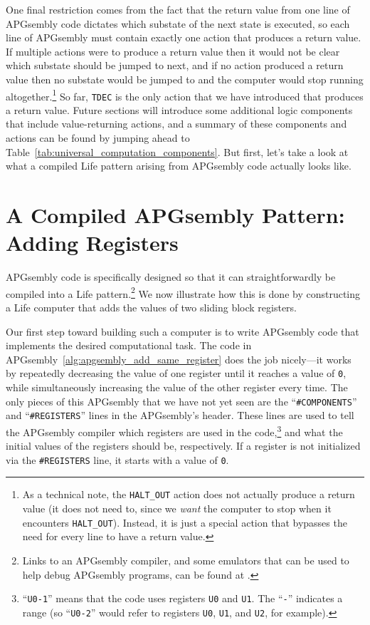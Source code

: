 One final restriction comes from the fact that the return value from one line of APGsembly code dictates which substate of the next state is executed, so each line of APGsembly must contain exactly one action that produces a return value. If multiple actions were to produce a return value then it would not be clear which substate should be jumped to next, and if no action produced a return value then no substate would be jumped to and the computer would stop running altogether.\footnote{As a technical note, the \texttt{HALT\_OUT} action does not actually produce a return value (it does not need to, since we \emph{want} the computer to stop when it encounters \texttt{HALT\_OUT}). Instead, it is just a special action that bypasses the need for every line to have a return value.} So far, \texttt{TDEC} is the only action that we have introduced that produces a return value. Future sections will introduce some additional logic components that include value-returning actions, and a summary of these components and actions can be found by jumping ahead to Table~\ref{tab:universal_computation_components}. But first, let's take a look at what a compiled Life pattern arising from APGsembly code actually looks like.


\section{A Compiled APGsembly Pattern: Adding Registers}\label{sec:compiled_add_two_registers}

APGsembly code is specifically designed so that it can straightforwardly be compiled into a Life pattern.\footnote{Links to an APGsembly compiler, and some emulators that can be used to help debug APGsembly programs, can be found at .} We now illustrate how this is done by constructing a Life computer that adds the values of two sliding block registers.

Our first step toward building such a computer is to write APGsembly code that implements the desired computational task. The code in APGsembly~\ref{alg:apgsembly_add_same_register} does the job nicely---it works by repeatedly decreasing the value of one register until it reaches a value of \texttt{0}, while simultaneously increasing the value of the other register every time. The only pieces of this APGsembly that we have not yet seen are the ``\texttt{\#COMPONENTS}'' and ``\texttt{\#REGISTERS}'' lines in the APGsembly's header. These lines are used to tell the APGsembly compiler which registers are used in the code,\footnote{``\texttt{U0-1}'' means that the code uses registers \texttt{U0} and \texttt{U1}. The ``\texttt{-}'' indicates a range (so ``\texttt{U0-2}'' would refer to registers \texttt{U0}, \texttt{U1}, and \texttt{U2}, for example).} and what the initial values of the registers should be, respectively. If a register is not initialized via the \texttt{\#REGISTERS} line, it starts with a value of \texttt{0}.

